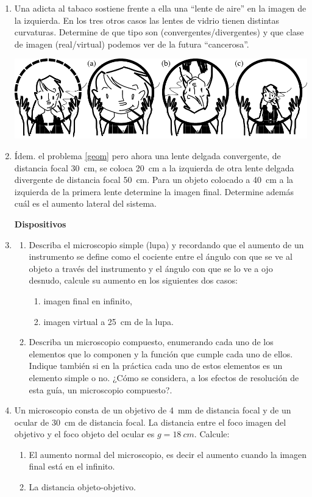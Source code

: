 \documentclass[11pt,spanish,a4paper]{article}
\begin{document}
\begin{enumerate}
\item Una adicta al tabaco sostiene frente a ella una ``lente de aire'' en la imagen de la izquierda.
	En los tres otros casos las lentes de vidrio tienen distintas curvaturas.
	Determine de que tipo son (convergentes/divergentes) y que clase de imagen (real/virtual) podemos ver de la futura ``cancerosa''.
	\begin{center}
		\includegraphics[width=0.75\linewidth]{fumadora}
	\end{center}


\item Ídem. el problema \ref{geom} pero ahora una lente delgada convergente, de distancia focal \SI{30}{cm}, se coloca \SI{20}{cm} a la izquierda de otra lente delgada divergente de distancia focal \SI{50}{cm}.
	    Para un objeto colocado a \SI{40}{cm} a la izquierda de la primera lente determine la imagen final.
		Determine además cuál es el aumento lateral del sistema.


	
\textbf{Dispositivos}


\item
\begin{enumerate}
	\item Describa el microscopio simple (lupa) y recordando que el aumento de un instrumento se define como el cociente entre el ángulo con que se ve al objeto a través del instrumento y el ángulo con que se lo ve a ojo desnudo, calcule su aumento en los siguientes dos casos:
	\begin{enumerate}
		\item imagen final en infinito, 
		\item imagen virtual a \SI{25}{cm} de la lupa.
	\end{enumerate}
	\item Describa un microscopio compuesto, enumerando cada uno de los elementos que lo componen y la función que cumple cada uno de ellos.
	Indique también si en la práctica cada uno de estos elementos es un elemento simple o no.
	¿Cómo se considera, a los efectos de resolución de esta guía, un microscopio compuesto?.
\end{enumerate}


\item Un microscopio consta de un objetivo de \SI{4}{mm} de distancia focal y de un ocular de \SI{30}{cm} de distancia focal.
	La distancia entre el foco imagen del objetivo y el foco objeto del ocular es \(g= \SI{18}{cm}\). Calcule:
\begin{enumerate}
	\item El aumento normal del microscopio, es decir el aumento cuando la imagen final está en el infinito.
	\item La distancia objeto-objetivo.
\end{enumerate}



\end{enumerate}
\end{document}
